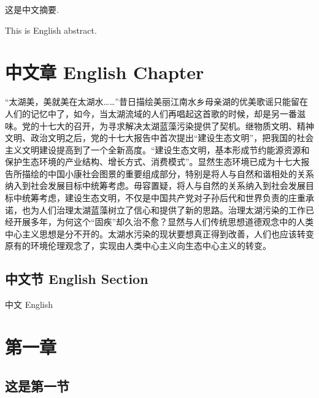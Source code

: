 \documentclass[shorttitle,oneside]{NJUbachelor}
\begin{document}
\setlength{\baselineskip}{1.26\baselineskip}

\makectitlepage

\begin{cabstract}
这是中文摘要.
\end{cabstract}

\begin{eabstract}
This is English abstract.
\end{eabstract}

\frontmatter
{}

\tableofcontents

\mainmatter

\chapter{中文章 English Chapter }

“太湖美，美就美在太湖水……”昔日描绘美丽江南水乡母亲湖的优美歌谣只能留在人们的记忆中了，如今，当太湖流域的人们再唱起这首歌的时候，却是另一番滋味。党的十七大的召开，为寻求解决太湖蓝藻污染提供了契机。继物质文明、精神文明、政治文明之后，党的十七大报告中首次提出“建设生态文明”，把我国的社会主义文明建设提高到了一个全新高度。“建设生态文明，基本形成节约能源资源和保护生态环境的产业结构、增长方式、消费模式”。显然生态环境已成为十七大报告所描绘的中国小康社会图景的重要组成部分，特别是将人与自然和谐相处的关系纳入到社会发展目标中统筹考虑。毋容置疑，将人与自然的关系纳入到社会发展目标中统筹考虑，建设生态文明，不仅是中国共产党对子孙后代和世界负责的庄重承诺，也为人们治理太湖蓝藻树立了信心和提供了新的思路。治理太湖污染的工作已经开展多年，为何这个“固疾”却久治不愈？显然与人们传统思想道德观念中的人类中心主义思想是分不开的。太湖水污染的现状要想真正得到改善，人们也应该转变原有的环境伦理观念了，实现由人类中心主义向生态中心主义的转变。

\section{中文节 English Section}

\newpage

{\heiti 中文 English}

\chapter{第一章}

\section{这是第一节}
\end{document}

